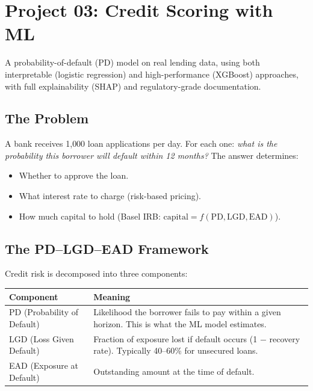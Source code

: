 \documentclass[11pt, a4paper]{article}
\begin{document}
\section{Project 03: Credit Scoring with ML}

\begin{objective}
A probability-of-default (PD) model on real lending data, using both interpretable (logistic regression) and high-performance (XGBoost) approaches, with full explainability (SHAP) and regulatory-grade documentation.
\end{objective}

\subsection{The Problem}

A bank receives 1{,}000 loan applications per day.
For each one: \emph{what is the probability this borrower will default within 12 months?}
The answer determines:
\begin{itemize}
    \item Whether to approve the loan.
    \item What interest rate to charge (risk-based pricing).
    \item How much capital to hold (Basel IRB: $\text{capital} = f(\text{PD}, \text{LGD}, \text{EAD})$).
\end{itemize}

\subsection{The PD--LGD--EAD Framework}

Credit risk is decomposed into three components:

\begin{table}[H]
\centering
\begin{tabular}{@{}lp{8cm}@{}}
\toprule
\textbf{Component} & \textbf{Meaning} \\
\midrule
PD (Probability of Default) & Likelihood the borrower fails to pay within a given horizon. This is what the ML model estimates. \\
LGD (Loss Given Default) & Fraction of exposure lost if default occurs (1 $-$ recovery rate). Typically 40--60\% for unsecured loans. \\
EAD (Exposure at Default) & Outstanding amount at the time of default. \\
\bottomrule
\end{tabular}
\end{table}
\end{document}
